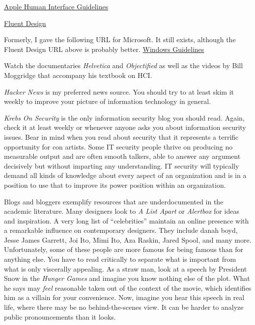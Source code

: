 \href{https://developer.apple.com/design/human-interface-guidelines/}{Apple
Human Interface Guidelines}

\href{https://www.microsoft.com/design/fluent/}{Fluent Design}

Formerly, I gave the following URL for Microsoft. It still exists,
although the Fluent Design URL above is probably better.
\href{https://docs.microsoft.com/en-us/windows/desktop/uxguide/guidelines}{Windows
Guidelines}

\hypertarget{misc}{%
\label{misc}}

Watch the documentaries \emph{Helvetica} and \emph{Objectified} as well
as the videos by Bill Moggridge that accompany his textbook on HCI.

\emph{Hacker News} is my preferred news source. You should try to at
least skim it weekly to improve your picture of information technology
in general.

\emph{Krebs On Security} is the only information security blog you
should read. Again, check it at least weekly or whenever anyone asks you
about information security issues. Bear in mind when you read about
security that it represents a terrific opportunity for con artists. Some
IT security people thrive on producing no measurable output and are
often smooth talkers, able to answer any argument decisively but without
imparting any understanding. IT security will typically demand all kinds
of knowledge about every aspect of an organization and is in a position
to use that to improve its power position within an organization.

Blogs and bloggers exemplify resources that are underdocumented in the
academic literature. Many designers look to \emph{A List Apart} or
\emph{Alertbox} for ideas and inspiration. A very long list of
``celebrities'' maintain an online presence with a remarkable influence
on contemporary designers. They include danah boyd, Jesse James Garrett,
Joi Ito, Mimi Ito, Aza Raskin, Jared Spool, and many more.
Unfortunately, some of these people are more famous for being famous
than for anything else. You have to read critically to separate what is
important from what is only viscerally appealing. As a straw man, look
at a speech by President Snow in the \emph{Hunger Games} and imagine you
know nothing else of the plot. What he says may \emph{feel} reasonable
taken out of the context of the movie, which identifies him as a villain
for your convenience. Now, imagine you hear this speech in real life,
where there may be no behind-the-scenes view. It can be harder to
analyze public pronouncements than it looks.

